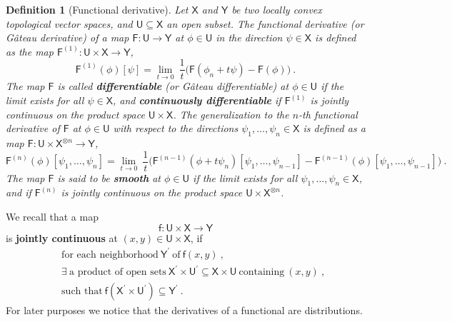\documentclass[11pt]{book}
\newcommand{\Fsf}{\mathsf{F}}
\newcommand{\Usf}{\mathsf{U}}
\newcommand{\Xsf}{\mathsf{X}}
\newcommand{\Ysf}{\mathsf{Y}}
\newcommand{\fsf}{\mathsf{f}}
\theoremstyle{break}
\newtheorem{definition}{Definition}[chapter]
\begin{document}
\begin{definition}[Functional derivative]\label{def:functional_derivative}
Let $\Xsf$ and $\Ysf$ be two locally convex topological vector spaces, and $\Usf \subseteq \Xsf$ an open subset. The functional derivative (or Gâteau derivative) of a map $\Fsf:  \Usf \to \Ysf$ at $\phi \in \Usf$ in the direction $\psi \in \Xsf$ is defined as the map $\Fsf^{(1)} : \Usf \times \Xsf \to \Ysf$,
%
\begin{equation*}
\Fsf^{(1)}(\phi)[\psi] = \lim_{t \to 0} \ \frac{1}{t} \bigg( \Fsf(\phi_n + t \psi) - \Fsf(\phi) \bigg) \ .
\end{equation*}
% 
The map $\Fsf$ is called \textbf{differentiable} (or Gâteau differentiable) at $\phi \in \Usf$ if the limit exists for all $\psi \in \Xsf$, and \textbf{continuously differentiable} if $\Fsf^{(1)}$ is jointly continuous on the product space $\Usf \times \Xsf$.
%
%
The generalization to the $n$-th functional derivative of $\Fsf$ at $\phi \in \Usf$ with respect to the directions $\psi_1, \dots, \psi_n \in \Xsf$ is defined as a map $\Fsf : \Usf \times \Xsf^{\otimes n} \to \Ysf$,
%
\begin{equation*}
\Fsf^{(n)}(\phi)[\psi_1,\dots ,\psi_n] = \lim_{t \to 0} \ \frac{1}{t} \bigg( \Fsf^{(n-1)}(\phi + t \psi_n)[\psi_1,\dots ,\psi_{n-1}] - \Fsf^{(n-1)}(\phi)[\psi_1,\dots ,\psi_{n-1}] \bigg) \ .
\end{equation*}
%
The map $\Fsf$ is said to be \textbf{smooth} at $\phi \in \Usf$ if the limit exists for all $\psi_1, \dots, \psi_n \in \Xsf$, and if $\Fsf^{(n)}$ is jointly continuous on the product space $\Usf \times \Xsf^{\otimes n}$.
\end{definition}


We recall that a map 
%
\begin{equation*}
\fsf : \Usf \times \Xsf \to \Ysf
\end{equation*}
%
is \textbf{jointly continuous} at $(x,y) \in \Usf \times \Xsf$, if 
%
\begin{eqnarray*}
&& \mbox{for each neighborhood} \ \Ysf^\prime \ \mbox{of} \ \fsf(x,y) \ , \\
&& \exists \ \mbox{a product of open sets} \ \Xsf^\prime \times \Usf^\prime \subseteq \Xsf \times \Usf \ \mbox{containing} \ (x,y) \ , \\
&& \mbox{such that} \ \fsf(\Xsf^\prime \times \Usf^\prime) \subseteq \Ysf^\prime \ .
\end{eqnarray*}
%
For later purposes we notice that the derivatives of a functional are distributions.
\end{document}
